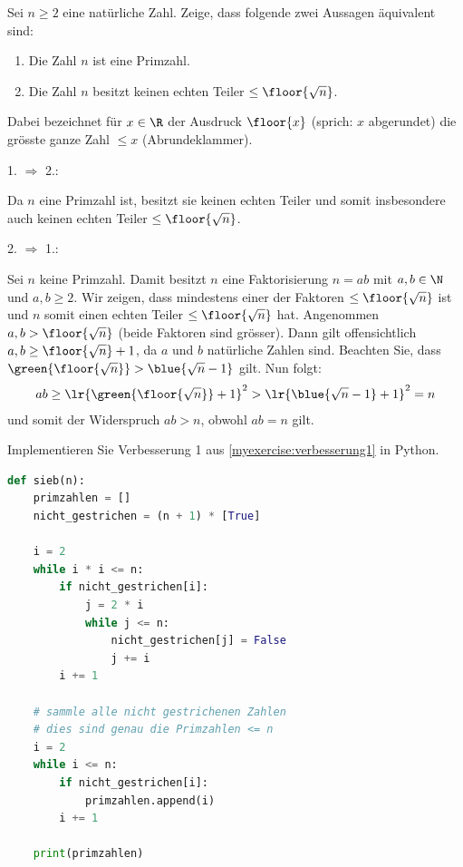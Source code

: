 	\begin{myexercise}[Verbesserung 1]\label{myexercise:verbesserung1}
		Sei $n\geq 2$ eine natürliche Zahl. Zeige, dass folgende zwei Aussagen äquivalent sind:
		\begin{enumerate}
			\item Die Zahl $n$ ist eine Primzahl.
			\item Die Zahl $n$ besitzt keinen echten Teiler $\leq \floor{\sqrt{n}}$.
		\end{enumerate}
		Dabei bezeichnet für $x\in\R$ der Ausdruck $\floor{x}$ (sprich: $x$ abgerundet) die grösste ganze Zahl $\leq x$ (Abrundeklammer).
		\begin{myanswer}
			1. $\Rightarrow$ 2.:

			Da $n$ eine Primzahl ist, besitzt sie keinen echten Teiler und somit insbesondere auch keinen echten Teiler $\leq \floor{\sqrt{n}}$.

			2. $\Rightarrow$ 1.:

			Sei $n$ keine Primzahl.
			Damit besitzt $n$ eine Faktorisierung $n = ab$ mit $a,b\in\N$ und $a,b\geq 2$.
			Wir zeigen, dass mindestens einer der Faktoren $\leq \floor{\sqrt{n}}$ ist und $n$ somit einen echten Teiler $\leq \floor{\sqrt{n}}$ hat.
			Angenommen $a, b > \floor{\sqrt{n}}$ (beide Faktoren sind grösser).
			Dann gilt offensichtlich $a, b \geq \floor{\sqrt{n}} + 1$, da $a$ und $b$ natürliche Zahlen sind.
			Beachten Sie, dass $\green{\floor{\sqrt{n}}} > \blue{\sqrt{n} - 1}$ gilt. Nun folgt:
			\begin{align*}
				ab \geq \lr{\green{\floor{\sqrt{n}}} + 1}^2 > \lr{\blue{\sqrt{n} - 1} + 1}^2 = n
			\end{align*}
			und somit der Widerspruch $ab > n$, obwohl $ab = n$ gilt.
		\end{myanswer}
	\end{myexercise}

	\begin{myexercise}\label{myexercise:implementVerbesserung1}
		Implementieren Sie Verbesserung 1 aus \cref{myexercise:verbesserung1} in Python.
		\begin{myanswer}
			\begin{lstlisting}[language=Python,caption=Verbesserung 1,numbers=none]
def sieb(n):
    primzahlen = []
    nicht_gestrichen = (n + 1) * [True]

    i = 2
    while i * i <= n:
        if nicht_gestrichen[i]:
            j = 2 * i
            while j <= n:
                nicht_gestrichen[j] = False
                j += i
        i += 1

    # sammle alle nicht gestrichenen Zahlen
    # dies sind genau die Primzahlen <= n
    i = 2
    while i <= n:
        if nicht_gestrichen[i]:
            primzahlen.append(i)
        i += 1

    print(primzahlen)
\end{lstlisting}
		\end{myanswer}
	\end{myexercise}

